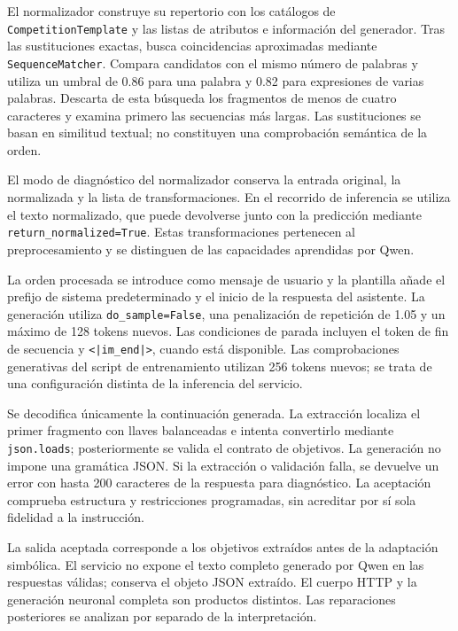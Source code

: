 El normalizador construye su repertorio con los catálogos de
\texttt{Competition\allowbreak Template} y las listas de atributos e información
del generador. Tras las sustituciones exactas, busca coincidencias
aproximadas mediante \texttt{Sequence\allowbreak Matcher}. Compara candidatos con
el mismo número de palabras y utiliza un umbral de 0.86 para una
palabra y 0.82 para expresiones de varias palabras. Descarta de esta
búsqueda los fragmentos de menos de cuatro caracteres y examina
primero las secuencias más largas. Las sustituciones se basan en
similitud textual; no constituyen una comprobación semántica de la orden.

El modo de diagnóstico del normalizador conserva la entrada original,
la normalizada y la lista de transformaciones. En el recorrido de
inferencia se utiliza el texto normalizado, que puede devolverse junto
con la predicción mediante \texttt{return\_\allowbreak normalized=True}. Estas
transformaciones pertenecen al preprocesamiento y se distinguen de
las capacidades aprendidas por Qwen.

La orden procesada se introduce como mensaje de usuario y la plantilla
añade el prefijo de sistema predeterminado y el inicio de la respuesta
del asistente. La generación utiliza \texttt{do\_\allowbreak sample=False}, una
penalización de repetición de 1.05 y un máximo de 128 tokens nuevos.
Las condiciones de parada incluyen el token de fin de secuencia y
\texttt{<|im\_end|>}, cuando está disponible. Las comprobaciones
generativas del script de entrenamiento utilizan 256 tokens nuevos;
se trata de una configuración distinta de la inferencia del servicio.

Se decodifica únicamente la continuación generada. La extracción
localiza el primer fragmento con llaves balanceadas e intenta
convertirlo mediante \texttt{json.loads}; posteriormente se valida el
contrato de objetivos. La generación no impone una gramática JSON.
Si la extracción o validación falla, se devuelve un error con hasta
200 caracteres de la respuesta para diagnóstico. La aceptación
comprueba estructura y restricciones programadas, sin acreditar por
sí sola fidelidad a la instrucción.

La salida aceptada corresponde a los objetivos extraídos antes de la
adaptación simbólica. El servicio no expone el texto completo generado
por Qwen en las respuestas válidas; conserva el objeto JSON extraído.
El cuerpo HTTP y la generación neuronal completa son productos distintos.
Las reparaciones posteriores se analizan por separado de la interpretación.


